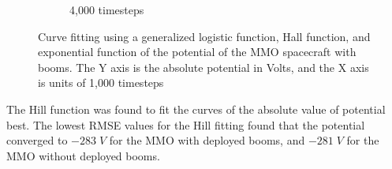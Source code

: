 \begin{center}
\begin{figure}[H]
\begin{subfigure}[b]{0.61\textwidth}
    \caption{4,000 timesteps}
    \label{fig:C_fit_NB_lim}
  \end{subfigure}
  \label{fig:Pot_noPH}
  \caption{Curve fitting using a generalized logistic function, Hall function, and exponential function of the potential of the MMO spacecraft with booms. The Y axis is the absolute potential in Volts, and the X axis is units of 1,000 timesteps}
\end{figure}
\end{center}

The Hill function was found to fit the curves of the absolute value of potential best. The lowest RMSE values for the Hill fitting found that the potential converged to $-283 \; V$ for the MMO with deployed booms, and $-281 \; V$ for the MMO without deployed booms. 


